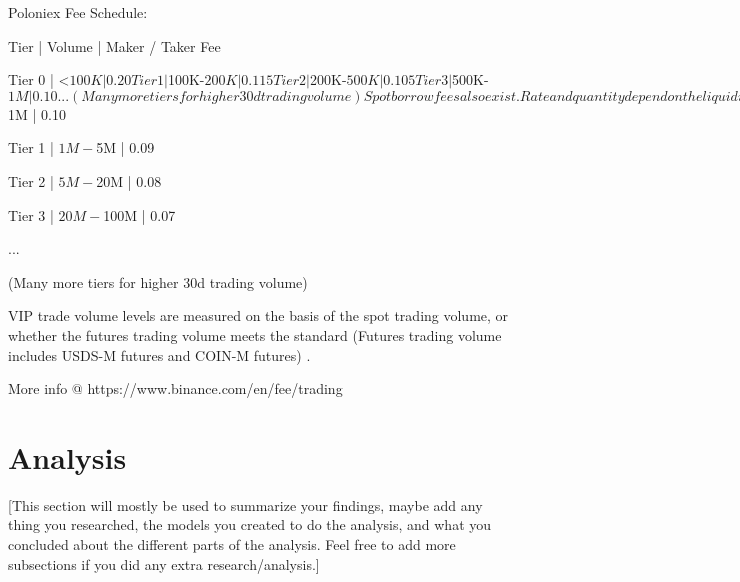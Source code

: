 \documentclass{article}
\begin{document}
Poloniex Fee Schedule:

Tier | Volume | Maker / Taker Fee

Tier 0 | <$100K      | 0.20%

Tier 1 | $100K-$200K | 0.115%

Tier 2 | $200K-$500K | 0.105%

Tier 3 | $500K-$1M   | 0.10%

...

(Many more tiers for higher 30d trading volume)

Spot borrow fees also exist. Rate and quantity depend on the liquidity and short interest of the token.

Borrow fees are paid hourly.

More info @ https://poloniex.com/profile/fee-tier/spot-trading



Binance Fee Schedule:

Tier       Volume     Maker/Taker Fee

Tier 0 | <$1M       | 0.10%

Tier 1 | $1M-$5M    | 0.09%

Tier 2 | $5M-$20M   | 0.08%

Tier 3 | $20M-$100M | 0.07%

...

(Many more tiers for higher 30d trading volume)

VIP trade volume levels are measured on the basis of the spot trading volume, or whether the futures trading volume meets the standard (Futures trading volume includes USDS-M futures and COIN-M futures) .

More info @ https://www.binance.com/en/fee/trading


\section{Analysis}
[This section will mostly be used to summarize your findings, maybe add any thing you researched, the models you created to do the analysis, and what you concluded about the different parts of the analysis. Feel free to add more subsections if you did any extra research/analysis.]
\end{document}
